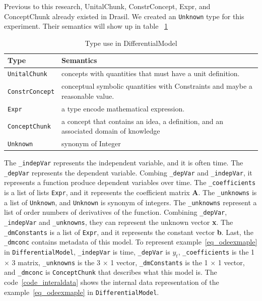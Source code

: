 Previous to this research, UnitalChunk, ConstrConcept, Expr, and ConceptChunk already existed in Drasil. We created an \verb|Unknown| type for this experiment. Their semantics will show up in table ~\ref{tab_demodeltype}

\begin{table}[ht]
	\begin{tabular}{ p{} p{} }
		\textbf{Type} & \textbf{Semantics} \\
		\toprule
		\verb|UnitalChunk| & concepts with quantities that must have a unit definition.\\
		\verb|ConstrConcept| & conceptual symbolic quantities with Constraints and maybe a reasonable value.\\
		\verb|Expr| & a type encode mathematical expression. \\
		\verb|ConceptChunk| & a concept that contains an idea, a definition, and an associated domain of knowledge\\
        \verb|Unknown|& synonym of Integer\\
		\bottomrule	
	\end{tabular}	
	\caption{Type use in DifferentialModel}	
	\label{tab_demodeltype}
\end{table}

The \verb|_indepVar| represents the independent variable, and it is often time. The \verb|_depVar| represents the dependent variable. Combing \verb|_depVar| and \verb|_indepVar|, it represents a function produce dependent variables over time. The \verb|_coefficients| is a list of lists \verb|Expr|, and it represents the coefficient matrix \textbf{A}. The \verb|_unknowns| is a list of \verb|Unknown|, and \verb|Unknown| is synonym of integers.
The \verb|_unknowns| represent a list of order numbers of derivatives of the function. Combining \verb|_depVar|, \verb|_indepVar| and \verb|_unknowns|, they can represent the unknown vector \textbf{x}. The \verb|_dmConstants| is a list of \verb|Expr|, and it represents the constant vector \textbf{b}. Last, the \verb|_dmconc| contains metadata of this model. To represent example~\ref{eq_odeexmaple} in \verb|DifferentialModel|, \verb|_indepVar| is time, \verb|_depVar| is $y_t$, \verb|_coefficients| is the 1 $\times$ 3 matrix, \verb|_unknowns| is the 3 $\times$ 1 vector, \verb|_dmConstants| is the 1 $\times$ 1 vector, and \verb|_dmconc| is \verb|ConceptChunk| that describes what this model is. The code~\ref{code_interaldata} shows the internal data representation of the example~\ref{eq_odeexmaple} in \verb|DifferentialModel|.

